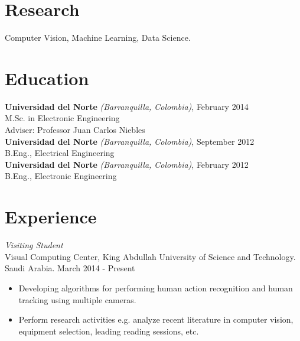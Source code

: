 \documentclass[margin]{res}
\begin{document}
 
 
 
\address{{\bf Present Address} \\ Al Khawarizmi Building (Bldg 1), 2106-WS06
          \\ Thuwal 23955-6900, Kingdom of Saudi Arabia}
\address{{\bf Contact} \\ escorciav@gmail.com \\ +966 56 948 5932}
 
\begin{resume} 
 
\section{Research} 
Computer Vision, Machine Learning, Data Science.


\section{Education}
\textbf{Universidad del Norte} \textit{(Barranquilla, Colombia)}, February 2014 \\
M.Sc. in Electronic Engineering\\
\bigskip Adviser: Professor Juan Carlos Niebles\\
\textbf{Universidad del Norte} \textit{(Barranquilla, Colombia)}, September 2012 \\
B.Eng., Electrical Engineering\\
\textbf{Universidad del Norte} \textit{(Barranquilla, Colombia)}, February 2012 \\
B.Eng., Electronic Engineering\\
 

\section{Experience}
 \textit{Visiting Student}\\
 Visual Computing Center, King Abdullah University of Science and Technology.
 Saudi Arabia. \hfill March 2014 - Present \\
 \begin{itemize} \itemsep -2pt %
 \item Developing algorithms for performing human action recognition and human
       tracking using multiple cameras.
 \item Perform research activities e.g. analyze recent literature in computer
       vision, equipment selection, leading reading sessions, etc.
 \end{itemize}
 

\end{resume}
\end{document}
